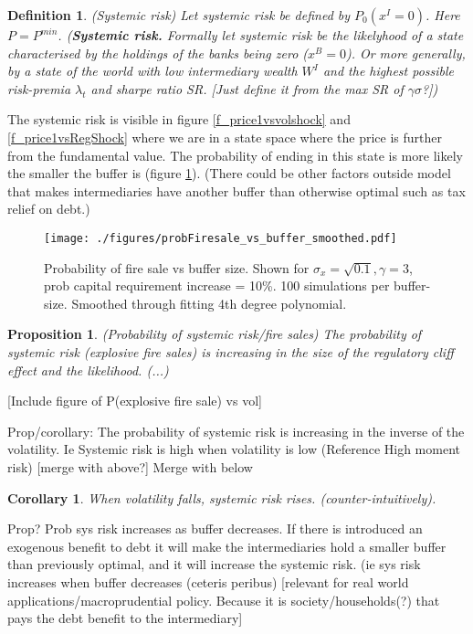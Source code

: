 \documentclass[11pt]{article}
\newtheorem{proposition}{Proposition}
\newtheorem{corollary}{Corollary}
\newtheorem{definition}{Definition}%
\begin{document}
\begin{definition} (Systemic risk)
Let systemic risk be defined by $P_0 (x^I=0)$. Here $P = P^{min}$.
(\textbf{Systemic risk.} Formally let systemic risk be the likelyhood of a state characterised by the holdings of the banks being zero ($x^B = 0$). Or more generally, by a state of the world with low intermediary wealth $W^I$ and the highest possible risk-premia $\lambda_t$ and sharpe ratio SR. [Just define it from the max SR of $\gamma\sigma$?])
\end{definition}

The systemic risk is visible in figure \ref{f_price1vsvolshock} and \ref{f_price1vsRegShock} where we are in a state space where the price is further from the fundamental value. The probability of ending in this state is more likely the smaller the buffer is (figure \ref{f_probFSvsBuffer}). (There could be other factors outside model that makes intermediaries have another buffer than otherwise optimal such as tax relief on debt.)

\begin{figure}[h]
\centering
\texttt{[image: ./figures/probFiresale\_vs\_buffer\_smoothed.pdf]}
\caption{Probability of fire sale vs buffer size. Shown for $\sigma_x = \sqrt{0.1}, \gamma = 3$, prob capital requirement increase = 10\%. 100 simulations per buffer-size. Smoothed through fitting 4th degree polynomial.}
\label{f_probFSvsBuffer}
\end{figure}


\begin{proposition} (Probability of systemic risk/fire sales)
The probability of systemic risk (explosive fire sales) is increasing in the size of the regulatory cliff effect and the likelihood. (...)
\end{proposition}

[Include figure of P(explosive fire sale) vs vol]

Prop/corollary: The probability of systemic risk is increasing in the inverse of the volatility. Ie Systemic risk is high when volatility is low (Reference High moment risk) [merge with above?]
Merge with below
\begin{corollary}
When volatility falls, systemic risk rises. (counter-intuitively).
\end{corollary}

Prop? Prob sys risk increases as buffer decreases. If there is introduced an exogenous benefit to debt it will make the intermediaries hold a smaller buffer than previously optimal, and it will increase the systemic risk. (ie sys risk increases when buffer decreases (ceteris peribus) [relevant for real world applications/macroprudential policy. Because it is society/households(?) that pays the debt benefit to the intermediary]
\end{document}
